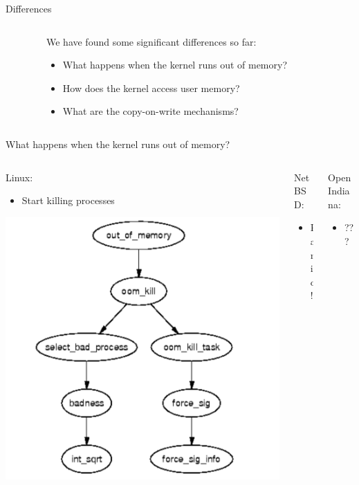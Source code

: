 \documentclass[aspectratio=169]{beamer}
\newcommand{\bi}{\begin{itemize}}
\newcommand{\ei}{\end{itemize}}
\begin{document}
\begin{frame}{Differences}
  \begin{columns}[T]
    \begin{column}{0.2\textwidth}
    \end{column}
    \begin{column}{0.6\textwidth}
      We have found some significant differences so far:
      \bi
      \pause
    \item What happens when the kernel runs out of memory?
      \pause
    \item How does the kernel access user memory?
      \pause
    \item What are the copy-on-write mechanisms?
      \ei
    \end{column}
    \begin{column}{0.2\textwidth}
    \end{column}
  \end{columns}
\end{frame}

\begin{frame}{What happens when the kernel runs out of memory?}
  \begin{columns}[T]
    \begin{column}{0.3\textwidth}
      Linux:
      \bi
    \item Start killing processes
      \ei
      \includegraphics[scale=0.35]{./figures/linux4.png}
    \end{column}
    \pause
    \begin{column}{0.4\textwidth}
      NetBSD:
      \bi
    \item Panic!
      \ei
    \end{column}
    \pause
    \begin{column}{0.3\textwidth}
      OpenIndiana:
      \bi
    \item ???
      \ei
    \end{column}
  \end{columns}
\end{frame}
\end{document}
